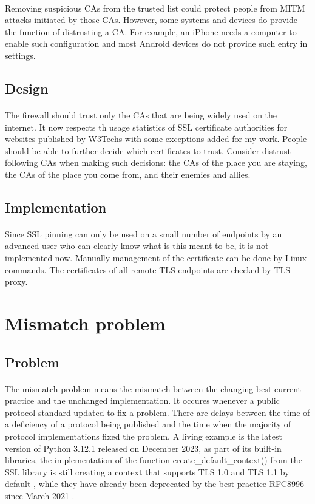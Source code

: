 \documentclass[mscthesis]{usiinfthesis}
\begin{document}
\paragraph{}
Removing suspicious CAs from the trusted list could protect people from MITM attacks initiated by those CAs. However, some systems and devices do provide the function of distrusting a CA. For example, an iPhone needs a computer to enable such configuration and most Android devices do not provide such entry in settings.
\subsection{Design}
\paragraph{}
The firewall should trust only the CAs that are being widely used on the internet. It now respects th usage statistics of SSL certificate authorities for websites published by W3Techs \citep{cert:stat} with some exceptions added for my work. People should be able to further decide which certificates to trust. Consider distrust following CAs when making such decisions: the CAs of the place you are staying, the CAs of the place you come from, and their enemies and allies.
\subsection{Implementation}
\paragraph{}
Since SSL pinning can only be used on a small number of endpoints by an advanced user who can clearly know what is this meant to be, it is not implemented now. Manually management of the certificate can be done by Linux commands. The certificates of all remote TLS endpoints are checked by TLS proxy.

\section{Mismatch problem}
\subsection{Problem}
\paragraph{}
The mismatch problem means the mismatch between the changing best current practice and the unchanged implementation. It occures whenever a public protocol standard updated to fix a problem. There are delays between the time of a deficiency of a protocol being published and the time when the majority of protocol implementations fixed the problem. A living example is the latest version of Python 3.12.1 released on December 2023, as part of its built-in libraries, the implementation of the function create\_default\_context() from the SSL library is still creating a context that supports TLS 1.0 and TLS 1.1 by default \citep{pyton:ssl}, while they have already been deprecated by the best practice RFC8996 since March 2021 \citep{rfc:notls11}.
\end{document}
